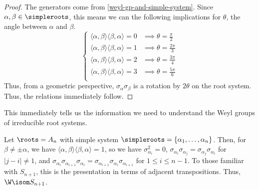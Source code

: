\documentclass[11pt,leqno,oneside]{amsart}
\numberwithin{thm}{section}
\begin{document}
\begin{proof}
  The generators come from \ref{weyl-gp-and-simple-system}. Since
  \(\alpha, \beta \in \simpleroots\), this means we can the following
  implications for \(\theta\), the angle between \(\alpha\)  and
  \(\beta\). \[
    \begin{cases}
      \langle \alpha,\beta \rangle\langle \beta,\alpha \rangle = 0
      & \implies \theta = \frac{\pi}{2} \\
      \langle \alpha,\beta \rangle\langle \beta,\alpha \rangle = 1
      & \implies \theta = \frac{2\pi}{3} \\
      \langle \alpha,\beta \rangle\langle \beta,\alpha \rangle = 2
      & \implies \theta = \frac{3\pi}{4} \\
      \langle \alpha,\beta \rangle\langle \beta,\alpha \rangle = 3
      & \implies \theta = \frac{5\pi}{6} \\
    \end{cases}
  \]
  Thus, from a geometric perspective, \(\sigma_\alpha \sigma_\beta\)
  is a rotation by \(2\theta\) on the root system. Thus, the relations
  immediately follow. 
\end{proof}
This immediately tells us the information we need to understand the
Weyl groups of irreducible root systems.
\begin{example}
  Let \(\roots = A_n\) with simple system \(\simpleroots = \{\alpha_1,
  \ldots, \alpha_n\}\). Then, for \(\beta \neq \pm \alpha\), we have
  \(\langle \alpha,\beta \rangle \langle \beta, \alpha \rangle = 1\),
  so we have \(\sigma_{\alpha_i}^2 = 0\), \(\sigma_{\alpha_i}
  \sigma_{\alpha_j} = \sigma_{\alpha_j} \sigma_{\alpha_i}\) for
  \(|j-i| \neq 1\), and
  \(\sigma_{\alpha_i}\sigma_{\alpha_{i+1}}\sigma_{\alpha_i} =
  \sigma_{\alpha_{i+1}} \sigma_{\alpha_i} \sigma_{\alpha_{i+1}}\) for
  \(1 \leq i \leq n-1\). To
  those familiar with \(S_{n+1}\), this is the presentation in terms
  of adjacent transpositions. Thus, \(\W \isom S_{n+1}\).
\end{example}
\end{document}
